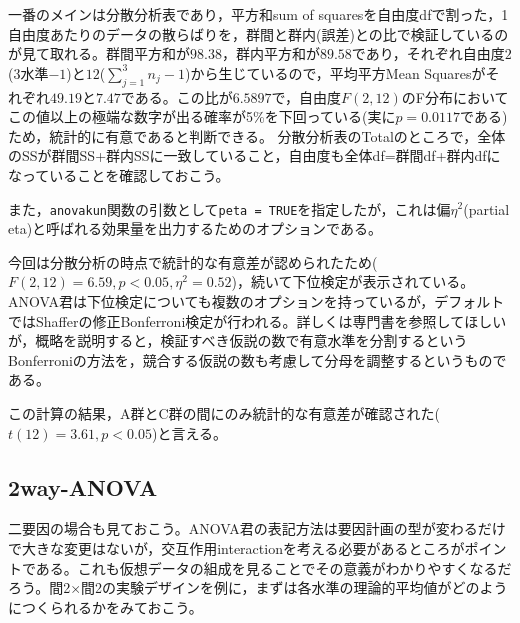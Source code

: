 \documentclass[
  a4paper,
]{ltjsbook}
\begin{document}
一番のメインは分散分析表であり，平方和sum of
squaresを自由度dfで割った，1自由度あたりのデータの散らばりを，群間と群内(誤差)との比で検証しているのが見て取れる。群間平方和が\(98.38\)，群内平方和が\(89.58\)であり，それぞれ自由度\(2\)(\(3\)水準\(-1\))と\(12\)(\(\sum_{j=1}^3 n_j-1\))から生じているので，平均平方Mean
Squaresがそれぞれ\(49.19\)と\(7.47\)である。この比が\(6.5897\)で，自由度\(F(2,12)\)のF分布においてこの値以上の極端な数字が出る確率が5\%を下回っている(実に\(p=0.0117\)である)ため，統計的に有意であると判断できる。
分散分析表のTotalのところで，全体のSSが群間SS+群内SSに一致していること，自由度も全体df=群間df+群内dfになっていることを確認しておこう。

また，\texttt{anovakun}関数の引数として\texttt{peta\ =\ TRUE}を指定したが，これは偏\(\eta^2\)(partial
eta)と呼ばれる効果量を出力するためのオプションである。

今回は分散分析の時点で統計的な有意差が認められたため(\(F(2,12)=6.59, p < 0.05, \eta^2=0.52\))，続いて下位検定が表示されている。ANOVA君は下位検定についても複数のオプションを持っているが，デフォルトではShafferの修正Bonferroni検定が行われる。詳しくは専門書\autocite{Nagata.kentei}を参照してほしいが，概略を説明すると，検証すべき仮説の数で有意水準を分割するというBonferroniの方法を，競合する仮説の数も考慮して分母を調整するというものである。

この計算の結果，A群とC群の間にのみ統計的な有意差が確認された(\(t(12)=3.61,p<0.05\))と言える。

\subsection{2way-ANOVA}\label{way-anova-1}

二要因の場合も見ておこう。ANOVA君の表記方法は要因計画の型が変わるだけで大きな変更はないが，交互作用interactionを考える必要があるところがポイントである。これも仮想データの組成を見ることでその意義がわかりやすくなるだろう。間2\(\times\)間2の実験デザインを例に，まずは各水準の理論的平均値がどのようにつくられるかをみておこう。
\end{document}
